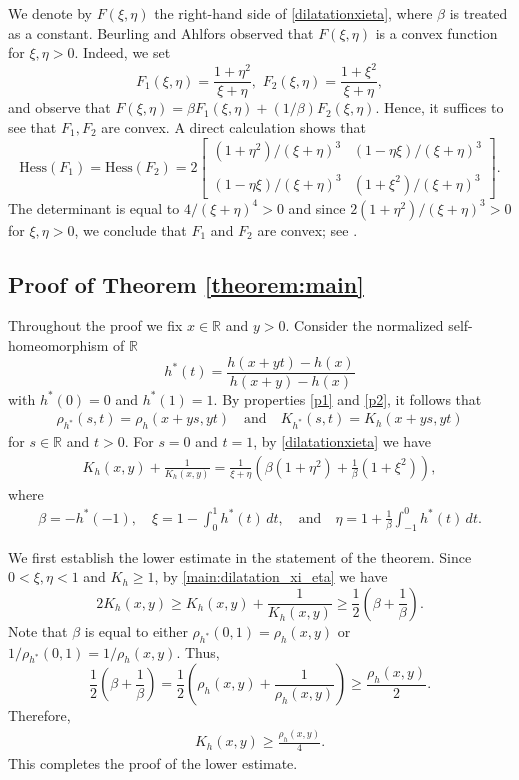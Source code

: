 \documentclass{amsart}
\theoremstyle{plain}
\theoremstyle{definition}
\theoremstyle{remark}
\numberwithin{equation}{section}
\numberwithin{theorem}{section}
\numberwithin{conjecture}{section}
\newcommand{\R}{\mathbb R}
\newcommand{\1}{\mathbf 1}
\begin{document}
We denote by $F(\xi,\eta)$ the right-hand side of \eqref{dilatationxieta}, where $\beta$ is treated as a constant. Beurling and Ahlfors \cite[pp.~137--138]{BeurlingAhlfors:extension} observed that $F(\xi,\eta)$  is a convex function for $\xi,\eta>0$. Indeed, we set
\[F_1(\xi,\eta)=\frac{1+\eta^2}{\xi+\eta},\,\,F_2(\xi,\eta)=\frac{1+\xi^2}{\xi+\eta},\]
and observe that $F(\xi,\eta)=\beta F_1(\xi,\eta)+(1/\beta) F_2(\xi,\eta)$. Hence, it suffices to see that $F_1,F_2$ are convex. A direct calculation shows that	
\begin{equation}\nonumber 
	\mathrm{Hess} (F_1)= \mathrm{Hess} (F_2) =2
	\begin{bmatrix}
	(1+\eta^2)/(\xi+\eta)^3  & (1-\eta \xi)/(\xi+\eta)^3 \\\\
	(1-\eta \xi)/(\xi+\eta)^3 & (1+\xi^2)/(\xi+\eta)^3
	\end{bmatrix}.
	\end{equation}
The determinant is equal to $4/(\xi+\eta)^4>0$ and since $2(1+\eta^2)/(\xi+\eta)^3>0$ for $\xi,\eta>0$, we conclude that $F_1$ and $F_2$ are convex; see \cite[Theorem 4.5]{Rockafellar:convex}.

\bigskip

\subsection{Proof of Theorem \ref{theorem:main}}\label{section:proof_sub}

Throughout the proof we fix $x \in \R$ and $y>0$. Consider the normalized self-homeomorphism of $\R$ 
\[h^*(t)=\frac{h(x+yt)-h(x)}{h(x+y)-h(x)}\]
with $h^*(0)=0$ and $h^*(1)=1$. By properties \ref{p1} and \ref{p2}, it follows that 
\begin{align}\nonumber
\rho_{h^*}(s,t)=\rho_h (x+ys,yt)\quad \textrm{and}\quad K_{h^*} (s,t)=K_h (x+ys,yt)
\end{align}
for $s\in \R$ and $t>0$. For $s=0$ and $t=1$, by \eqref{dilatationxieta} we have
\begin{align}\label{main:dilatation_xi_eta}
K_{h}(x,y)+\frac{1}{K_{h}(x,y)}=\frac{1}{\xi+\eta}\left(\beta(1+\eta^2)+\frac{1}{\beta}(1+\xi^2)\right),
\end{align}
where 
\begin{align}\label{main:betaxieta}
\beta=-h^*(-1),\quad\xi=1-\int_0^1 h^*(t)\,dt,\quad \textrm{and}\quad\eta=1+\frac{1}{\beta}\int_{-1}^0 h^*(t)\,dt.
\end{align}

We first establish the lower estimate in the statement of the theorem.  Since $0<\xi,\eta<1$ and $K_h\geq 1$, by \eqref{main:dilatation_xi_eta} we have 
$$2K_{h}(x,y)\ge K_{h}(x,y)+\frac{1}{K_{h}(x,y)}\geq \frac{1}{2}\left(\beta+\frac{1}{\beta}\right).$$
Note that $\beta$ is equal to either $\rho_{h^*} (0,1)=\rho_h (x,y)$ or $1/\rho_{h^*} (0,1)=1/\rho_h (x,y)$. Thus, 
$$\frac{1}{2}\left(\beta+\frac{1}{\beta}\right)= \frac{1}{2}\left(\rho_h (x,y)+\frac{1}{\rho_h (x,y)}\right)\ge \frac{{\rho_h (x,y)}}{2}.$$
Therefore,
\begin{align*}
K_{h}(x,y)\ge \frac{{\rho_h (x,y)}}{4}.
\end{align*}
This completes the proof of the lower estimate.
\end{document}
